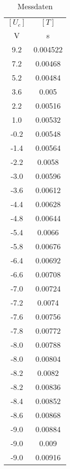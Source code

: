 \documentclass[captions=tableheading]{scrartcl}
\begin{document}


\begin{table}
  \centering
  \caption{Messdaten}
  \label{tab:some_data}
  \begin{tabular}{c c}
    \toprule
     $[U_c]$  &		$[T]$		  \\
      V     &   s       \\
      9.2	&		0.004522\\
      7.2	&		0.00468\\
      5.2	&		0.00484\\
      3.6	&		0.005\\
      2.2	&		0.00516\\
      1.0  &		0.00532\\
     -0.2	&		0.00548\\
     -1.4	&		0.00564\\
     -2.2	&		0.0058\\
     -3.0  &		0.00596\\
     -3.6	&		0.00612\\
     -4.4	&		0.00628\\
     -4.8	&		0.00644\\
     -5.4	&		0.0066\\
     -5.8	&		0.00676\\
     -6.4	&		0.00692\\
     -6.6	&		0.00708\\
     -7.0	&  	0.00724\\
     -7.2	&		0.0074\\
     -7.6	&		0.00756\\
     -7.8	&		0.00772\\
     -8.0	&  	0.00788\\
     -8.0	&	  0.00804\\
     -8.2	&		0.0082\\
     -8.2	&		0.00836\\
     -8.4	&		0.00852\\
     -8.6	&		0.00868\\
     -9.0 	&		0.00884\\
     -9.0 	&		0.009\\
     -9.0 	&		0.00916\\
    \midrule
      
    \bottomrule
  \end{tabular}
\end{table}

\end{document}
